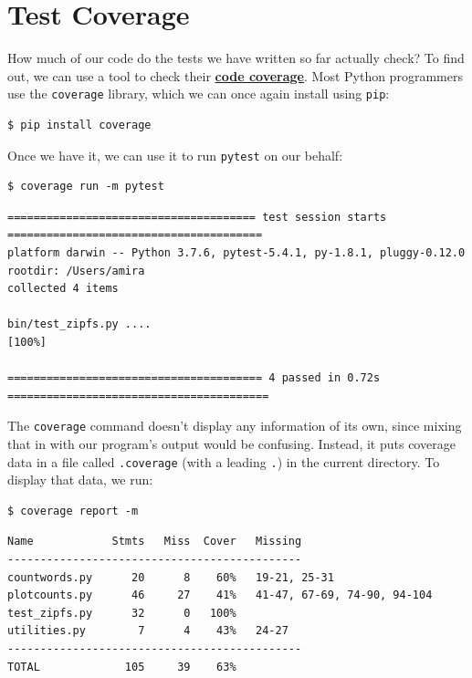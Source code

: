 \documentclass[
]{krantz}
\newcommand{\gref}[2]{\hyperlink{#2}{\textbf{#1}}}
\begin{document}
\hypertarget{testing-coverage}{%
\section{Test Coverage}\label{testing-coverage}}

How much of our code do the tests we have written so far actually check?
To find out,
we can use a tool to check their \gref{code coverage}{code\_coverage}.
Most Python programmers use the \texttt{coverage} library,
which we can once again install using \texttt{pip}:

\begin{verbatim}
$ pip install coverage
\end{verbatim}

Once we have it,
we can use it to run \texttt{pytest} on our behalf:

\begin{verbatim}
$ coverage run -m pytest
\end{verbatim}

\begin{verbatim}
====================================== test session starts =======================================
platform darwin -- Python 3.7.6, pytest-5.4.1, py-1.8.1, pluggy-0.12.0
rootdir: /Users/amira
collected 4 items                                                                                

bin/test_zipfs.py ....                                                                     [100%]

======================================= 4 passed in 0.72s ========================================
\end{verbatim}

The \texttt{coverage} command doesn't display any information of its own,
since mixing that in with our program's output would be confusing.
Instead,
it puts coverage data in a file called \texttt{.coverage} (with a leading \texttt{.}) in the current directory.
To display that data,
we run:

\begin{verbatim}
$ coverage report -m
\end{verbatim}

\begin{verbatim}
Name            Stmts   Miss  Cover   Missing
---------------------------------------------
countwords.py      20      8    60%   19-21, 25-31
plotcounts.py      46     27    41%   41-47, 67-69, 74-90, 94-104
test_zipfs.py      32      0   100%
utilities.py        7      4    43%   24-27
---------------------------------------------
TOTAL             105     39    63%
\end{verbatim}
\end{document}
